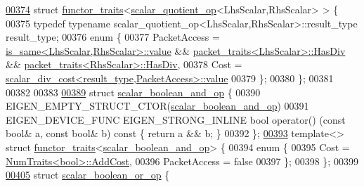 \begin{DoxyCode}
\hyperlink{struct_eigen_1_1internal_1_1functor__traits_3_01scalar__quotient__op_3_01_lhs_scalar_00_01_rhs_scalar_01_4_01_4}{00374} \textcolor{keyword}{struct }\hyperlink{struct_eigen_1_1internal_1_1functor__traits}{functor\_traits}<\hyperlink{struct_eigen_1_1internal_1_1scalar__quotient__op}{scalar\_quotient\_op}<LhsScalar,RhsScalar> > \{
00375   \textcolor{keyword}{typedef} \textcolor{keyword}{typename} scalar\_quotient\_op<LhsScalar,RhsScalar>::result\_type result\_type;
00376   \textcolor{keyword}{enum} \{
00377     PacketAccess = \hyperlink{struct_eigen_1_1internal_1_1is__same}{is\_same<LhsScalar,RhsScalar>::value} && 
      \hyperlink{struct_eigen_1_1internal_1_1packet__traits}{packet\_traits<LhsScalar>::HasDiv} && 
      \hyperlink{struct_eigen_1_1internal_1_1packet__traits}{packet\_traits<RhsScalar>::HasDiv},
00378     Cost = \hyperlink{struct_eigen_1_1internal_1_1scalar__div__cost}{scalar\_div\_cost<result\_type,PacketAccess>::value}
00379   \};
00380 \};
00381 
00382 
00383 
\hyperlink{struct_eigen_1_1internal_1_1scalar__boolean__and__op}{00389} \textcolor{keyword}{struct }\hyperlink{struct_eigen_1_1internal_1_1scalar__boolean__and__op}{scalar\_boolean\_and\_op} \{
00390   EIGEN\_EMPTY\_STRUCT\_CTOR(\hyperlink{struct_eigen_1_1internal_1_1scalar__boolean__and__op}{scalar\_boolean\_and\_op})
00391   EIGEN\_DEVICE\_FUNC EIGEN\_STRONG\_INLINE \textcolor{keywordtype}{bool} operator() (\textcolor{keyword}{const} \textcolor{keywordtype}{bool}& a, \textcolor{keyword}{const} \textcolor{keywordtype}{bool}& b)\textcolor{keyword}{ const }\{ \textcolor{keywordflow}{return} a && 
      b; \}
00392 \};
\hyperlink{struct_eigen_1_1internal_1_1functor__traits_3_01scalar__boolean__and__op_01_4}{00393} \textcolor{keyword}{template}<> \textcolor{keyword}{struct }\hyperlink{struct_eigen_1_1internal_1_1functor__traits}{functor\_traits}<\hyperlink{struct_eigen_1_1internal_1_1scalar__boolean__and__op}{scalar\_boolean\_and\_op}> \{
00394   \textcolor{keyword}{enum} \{
00395     Cost = \hyperlink{group___core___module_struct_eigen_1_1_num_traits}{NumTraits<bool>::AddCost},
00396     PacketAccess = \textcolor{keyword}{false}
00397   \};
00398 \};
00399 
\hyperlink{struct_eigen_1_1internal_1_1scalar__boolean__or__op}{00405} \textcolor{keyword}{struct }\hyperlink{struct_eigen_1_1internal_1_1scalar__boolean__or__op}{scalar\_boolean\_or\_op} \{

\end{DoxyCode}
